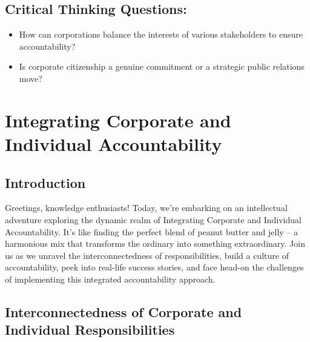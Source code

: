 \documentclass[
  letterpaper,
  DIV=11,
  numbers=noendperiod]{scrreprt}
\begin{document}
\subsection{Critical Thinking
Questions:}\label{critical-thinking-questions-4}

\begin{itemize}
\item
  How can corporations balance the interests of various stakeholders to
  ensure accountability?
\item
  Is corporate citizenship a genuine commitment or a strategic public
  relations move?
\end{itemize}

\section{Integrating Corporate and Individual
Accountability}\label{integrating-corporate-and-individual-accountability}

\subsection{Introduction}\label{introduction-6}

Greetings, knowledge enthusiasts! Today, we're embarking on an
intellectual adventure exploring the dynamic realm of Integrating
Corporate and Individual Accountability. It's like finding the perfect
blend of peanut butter and jelly -- a harmonious mix that transforms the
ordinary into something extraordinary. Join us as we unravel the
interconnectedness of responsibilities, build a culture of
accountability, peek into real-life success stories, and face head-on
the challenges of implementing this integrated accountability approach.

\subsection{Interconnectedness of Corporate and Individual
Responsibilities}\label{interconnectedness-of-corporate-and-individual-responsibilities}
\end{document}
